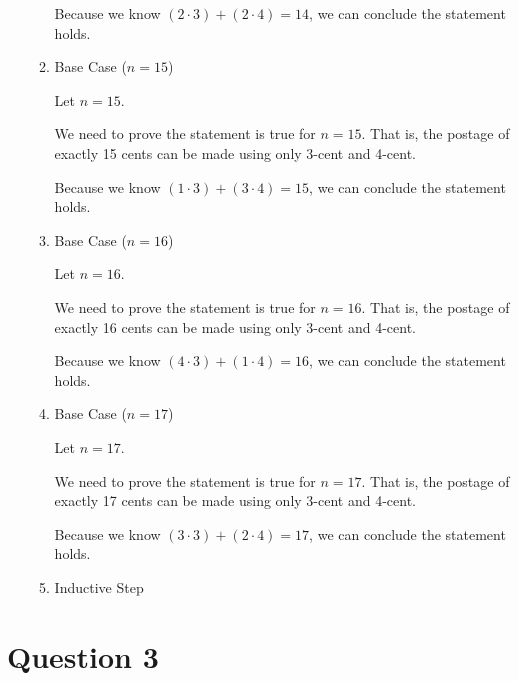 \documentclass[12pt]{article}
\begin{document}
\begin{itemize}
\begin{mdframed}
\begin{enumerate}[1.]
\begin{mdframed}
            Because we know $(2 \cdot 3) + (2 \cdot 4)=14$, we can conclude the statement holds.

            \end{mdframed}

            \item Base Case ($n = 15$)

            \begin{mdframed}
            Let $n = 15$.

            \bigskip

            We need to prove the statement is true for $n = 15$. That is, the
            postage of exactly 15 cents can be made using only 3-cent and 4-cent.

            \bigskip

            Because we know $(1 \cdot 3) + (3 \cdot 4)=15$, we can conclude the statement holds.

            \end{mdframed}

            \item Base Case ($n = 16$)

            \begin{mdframed}
            Let $n = 16$.

            \bigskip

            We need to prove the statement is true for $n = 16$. That is, the
            postage of exactly 16 cents can be made using only 3-cent and 4-cent.

            \bigskip

            Because we know $(4 \cdot 3) + (1 \cdot 4)=16$, we can conclude the statement holds.

            \end{mdframed}

            \item Base Case ($n = 17$)

            \begin{mdframed}
            Let $n = 17$.

            \bigskip

            We need to prove the statement is true for $n = 17$. That is, the
            postage of exactly 17 cents can be made using only 3-cent and 4-cent.

            \bigskip

            Because we know $(3 \cdot 3) + (2 \cdot 4)=17$, we can conclude the statement holds.

            \end{mdframed}

            \item Inductive Step
        \end{enumerate}
    \end{mdframed}
\end{itemize}

\section*{Question 3}
\end{document}
